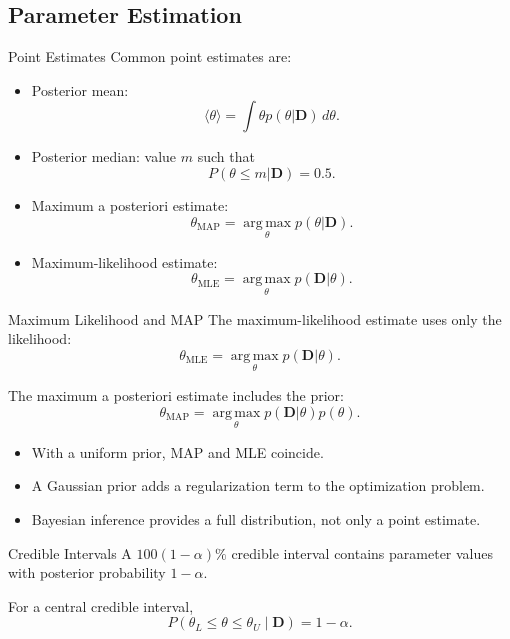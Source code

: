 \documentclass[a4paper, 10pt, onepage]{elegantbook}
\begin{document}
{\subsection{Parameter Estimation}

\begin{frame}{Point Estimates}
  Common point estimates are:
  \begin{itemize}
    \item Posterior mean:
    \[
      \langle\theta\rangle
      =
      \int\theta p(\theta|\mathbf{D})\,d\theta.
    \]
    \item Posterior median: value \(m\) such that
    \[
      P(\theta\le m|\mathbf{D})=0.5.
    \]
    \item Maximum a posteriori estimate:
    \[
      \theta_{\mathrm{MAP}}
      =
      \operatorname*{arg\,max}_\theta
      p(\theta|\mathbf{D}).
    \]
    \item Maximum-likelihood estimate:
    \[
      \theta_{\mathrm{MLE}}
      =
      \operatorname*{arg\,max}_\theta
      p(\mathbf{D}|\theta).
    \]
  \end{itemize}
\end{frame}

\begin{frame}{Maximum Likelihood and MAP}
  The maximum-likelihood estimate uses only the likelihood:
  \[
    \theta_{\mathrm{MLE}}
    =
    \operatorname*{arg\,max}_\theta
    p(\mathbf{D}|\theta).
  \]

  The maximum a posteriori estimate includes the prior:
  \[
    \theta_{\mathrm{MAP}}
    =
    \operatorname*{arg\,max}_\theta
    p(\mathbf{D}|\theta)p(\theta).
  \]

  \begin{itemize}
    \item With a uniform prior, MAP and MLE coincide.
    \item A Gaussian prior adds a regularization term to the optimization problem.
    \item Bayesian inference provides a full distribution, not only a point estimate.
  \end{itemize}
\end{frame}

\begin{frame}{Credible Intervals}
  A \(100(1-\alpha)\%\) credible interval contains parameter values with posterior probability \(1-\alpha\).

  For a central credible interval,
  \[
    P\left(
      \theta_L\le\theta\le\theta_U
      \mid\mathbf{D}
    \right)
    =
    1-\alpha.
  \]


\end{frame}}
\end{document}

